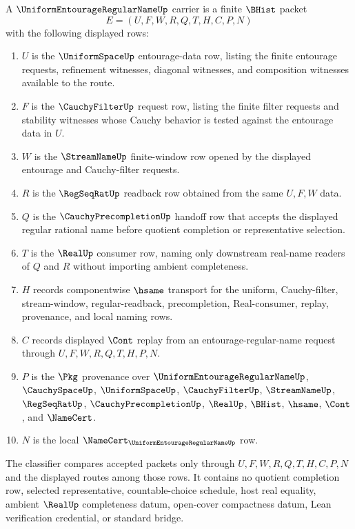 \begin{definition}
\label{def:uniform-entourage-regular-name-carrier}
A $\UniformEntourageRegularNameUp$ carrier is a finite $\BHist$ packet
$$
E=(U,F,W,R,Q,T,H,C,P,N)
$$
with the following displayed rows:
\begin{enumerate}
\item $U$ is the $\UniformSpaceUp$ entourage-data row, listing the finite entourage requests, refinement witnesses, diagonal witnesses, and composition witnesses available to the route.
\item $F$ is the $\CauchyFilterUp$ request row, listing the finite filter requests and stability witnesses whose Cauchy behavior is tested against the entourage data in $U$.
\item $W$ is the $\StreamNameUp$ finite-window row opened by the displayed entourage and Cauchy-filter requests.
\item $R$ is the $\RegSeqRatUp$ readback row obtained from the same $U,F,W$ data.
\item $Q$ is the $\CauchyPrecompletionUp$ handoff row that accepts the displayed regular rational name before quotient completion or representative selection.
\item $T$ is the $\RealUp$ consumer row, naming only downstream real-name readers of $Q$ and $R$ without importing ambient completeness.
\item $H$ records componentwise $\hsame$ transport for the uniform, Cauchy-filter, stream-window, regular-readback, precompletion, Real-consumer, replay, provenance, and local naming rows.
\item $C$ records displayed $\Cont$ replay from an entourage-regular-name request through $U,F,W,R,Q,T,H,P,N$.
\item $P$ is the $\Pkg$ provenance over $\UniformEntourageRegularNameUp$, $\CauchySpaceUp$, $\UniformSpaceUp$, $\CauchyFilterUp$, $\StreamNameUp$, $\RegSeqRatUp$, $\CauchyPrecompletionUp$, $\RealUp$, $\BHist$, $\hsame$, $\Cont$, and $\NameCert$.
\item $N$ is the local $\NameCert_{\UniformEntourageRegularNameUp}$ row.
\end{enumerate}
The classifier compares accepted packets only through $U,F,W,R,Q,T,H,C,P,N$ and the displayed routes among those rows. It contains no quotient completion row, selected representative, countable-choice schedule, host real equality, ambient $\RealUp$ completeness datum, open-cover compactness datum, Lean verification credential, or standard bridge.
\end{definition}

